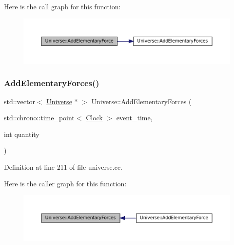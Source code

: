 Here is the call graph for this function\+:\nopagebreak
\begin{figure}[H]
\begin{center}
\leavevmode
\includegraphics[width=350pt]{class_universe_a90c573dec55f2b3ad5680015356f5f25_cgraph}
\end{center}
\end{figure}
\mbox{\label{class_universe_a81d294300346e9f901836ab609cce942}} 
\subsubsection{\texorpdfstring{Add\+Elementary\+Forces()}{AddElementaryForces()}}
{\footnotesize\ttfamily std\+::vector$<$ \mbox{\hyperlink{class_universe}{Universe}} $\ast$ $>$ Universe\+::\+Add\+Elementary\+Forces (\begin{DoxyParamCaption}\item[{std\+::chrono\+::time\+\_\+point$<$ \mbox{\hyperlink{universe_8h_a0ef8d951d1ca5ab3cfaf7ab4c7a6fd80}{Clock}} $>$}]{event\+\_\+time,  }\item[{int}]{quantity }\end{DoxyParamCaption})}



Definition at line 211 of file universe.\+cc.

Here is the caller graph for this function\+:\nopagebreak
\begin{figure}[H]
\begin{center}
\leavevmode
\includegraphics[width=350pt]{class_universe_a81d294300346e9f901836ab609cce942_icgraph}
\end{center}
\end{figure}
\mbox{\label{class_universe_ab9c84e0576de50aa4fa46655832ce5e4}} 
